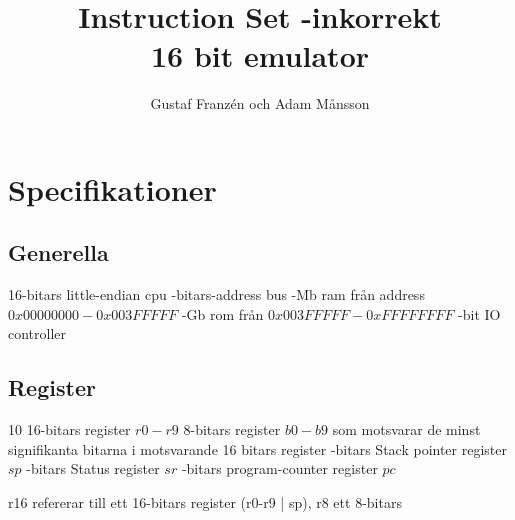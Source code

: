 \documentclass{article}
\title{Instruction Set -inkorrekt \\\small 16 bit emulator}
\author{Gustaf Franzén och Adam Månsson}
\begin{document}
	\maketitle

	\section*{Specifikationer}

	\subsection*{Generella}
	16-bitars little-endian cpu -bitars-address bus -Mb ram från address \(0x00000000 - 0x003FFFFF\) -Gb rom från \(0x003FFFFF - 0xFFFFFFFF\) -bit IO controller

	\subsection*{Register}
	10 16-bitars register \(r0 - r9\)  8-bitars register \(b0 - b9\) som motsvarar de minst
	signifikanta bitarna i motsvarande 16 bitars register
	-bitars Stack pointer register \(sp\) -bitars Status register \(sr\) -bitars program-counter register \(pc\)

	r16 refererar till ett 16-bitars register (r0-r9 | sp), r8 ett 8-bitars
\end{document}
